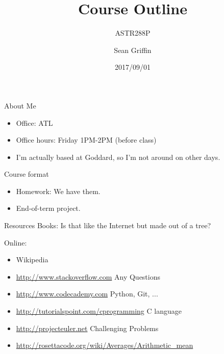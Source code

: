 \documentclass[10pt]{beamer}
\title{Course Outline}
\subtitle{ASTR288P}
\date{2017/09/01}
\author{Sean Griffin}
\institute{UMCP / NASA GSFC}
\begin{document}
\maketitle


\begin{frame}[fragile]{About Me}
\begin{itemize}
	\item Office: ATL
	\item Office hours: Friday 1PM-2PM (before class)
	\item I'm actually based at Goddard, so I'm not around on other days.
\end{itemize}
\end{frame}

\begin{frame}[fragile]{Course format}
\begin{itemize}
	\item Homework: We have them.
	\item End-of-term project. 
\end{itemize}
\end{frame}

\begin{frame}[fragile]{Resources}
	Books: Is that like the Internet but made out of a tree? 
	
	Online: 
	\begin{itemize}
		\item Wikipedia
		\item \url{http://www.stackoverflow.com} Any Questions
		\item \url{http://www.codecademy.com} Python, Git, ...
		\item \url{http://tutorialspoint.com/cprogramming} C language
		\item \url{http://projecteuler.net} Challenging Problems
    		\item \url{http://rosettacode.org/wiki/Averages/Arithmetic_mean}
	\end{itemize}

\end{frame}
\end{document}
